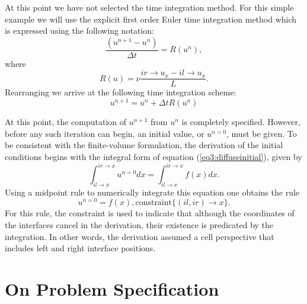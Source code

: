 \documentclass[10pt,epsf,letterpaper,twoside]{book}
\begin{document}
At this point we have not selected the time integration method.  For
this simple example we will use the explicit first order Euler time
integration method which is expressed using the following notation:
\begin{equation}
\frac{(u^{n+1}-u^{n})}{\Delta t} = R(u^n),
\end{equation}
where
\begin{equation}
R(u) = \nu \frac{{ir \rightarrow u_x - il \rightarrow u_x} }{L}.
\label{eq3:residue}
\end{equation}
Rearranging we arrive at the following time integration scheme:
\begin{equation}
u^{n+1} = u^{n} + \Delta t R(u^n)
\label{eq3:eulerStep}
\end{equation}


At this point, the computation of $u^{n+1}$ from $u^n$ is completely
specified.  However, before any such iteration can begin, an initial
value, or $u^{n=0}$, must be given.  To be consistent with the
finite-volume formulation, the derivation of the initial conditions
begins with the integral form of equation (\ref{eq3:diffuseinitial}),
given by
\begin{equation}
\int^{ir\rightarrow x}_{il\rightarrow x} u^{n=0} dx =
\int^{ir\rightarrow x}_{il\rightarrow x} f(x) dx.
\end{equation}
Using a midpoint rule to numerically integrate this equation one
obtains the rule
\begin{equation}
u^{n=0} = f(x), \mbox{constraint}\lbrace (il,ir)\rightarrow x\rbrace.
\label{eq3:ic}
\end{equation}
For this rule, the constraint is used to indicate that although the
coordinates of the interfaces cancel in the derivation, their
existence is predicated by the integration.  In other words, the
derivation assumed a cell perspective that includes left and right
interface positions.

\section{On Problem Specification}
\end{document}
